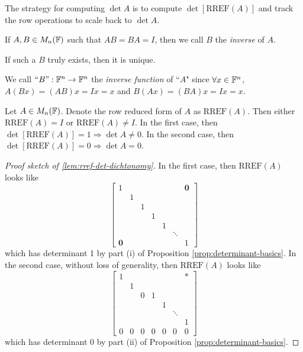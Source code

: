 \begin{note*}
The strategy for computing $\det A$ is to compute $\det\left[\text{RREF}(A)\right]$ and track the row operations to scale back to $\det A$. \\
\end{note*}

\begin{definition}[Inverse]
If $A, B \in M_n(\mathbb F)$ such that $AB = BA = I$, then we call $B$ the \textit{inverse} of $A$.
\end{definition}

\begin{remark*}
If such a $B$ truly exists, then it is unique.
\end{remark*}

\begin{remark*}
We call $``B": \mathbb F^n \rightarrow \mathbb F^n$ the \textit{inverse function}  of ``$A$" since $\forall x \in \mathbb F^n$, $A(Bx) = (AB)x = Ix = x$ and $B(Ax) = (BA)x = Ix = x$.
\end{remark*}

\begin{lemma}
\label{lem:rref-det-dichtonomy}
Let $A \in M_n(\mathbb F)$. Denote the row reduced form of $A$ as $\text{RREF}(A)$. Then either $\text{RREF}(A) = I$ or $\text{RREF}(A) \not= I$. In the first case, then $\det[\text{RREF}(A)] = 1 \Longrightarrow \det A \not= 0$. In the second case, then $\det[\text{RREF}(A)] = 0 \Longrightarrow \det A = 0$.
\end{lemma}
\begin{proof}[Proof sketch of \ref{lem:rref-det-dichtonomy}]
In the first case, then $\text{RREF}(A)$ looks like
$$
\begin{bmatrix}
1 &   &   &   &   &   & \mathbf{0} \\
  & 1 &   &   &   &   &   \\
  &   & 1 &   &   &   &   \\
  &   &   & 1 &   &   &   \\
  &   &   &   & 1 &   &   \\
  &   &   &   &   & \ddots & \\
\mathbf{0} &   &   &   &   &        & 1
\end{bmatrix}
$$
which has determinant 1 by part (i) of Proposition \ref{prop:determinant-basics}. In the second case, without loss of generality, then $\text{RREF}(A)$ looks like
$$
\begin{bmatrix}
1 &   &   &   &   &   & * \\
  & 1 &   &   &   &   &   \\
  &   & 0 & 1 &   &   &   \\
  &   &   &   & 1 &   &   \\
  &   &   &   &   & \ddots & \\
  &   &   &   &   &   & 1 \\
0 & 0 & 0 & 0 & 0 & 0 & 0
\end{bmatrix}
$$
which has determinant 0 by part (ii) of Proposition \ref{prop:determinant-basics}.
\end{proof}

